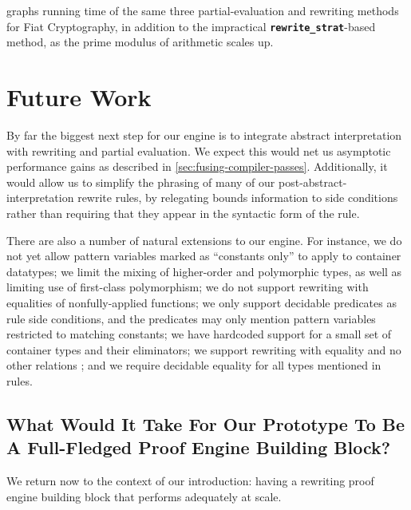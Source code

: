 \documentclass[sn-mathphys,pdflatex]{sn-jnl}%
\newcommand{\tacrewritestrat}{\textbf{\texttt{rewrite\_strat}}}
\theoremstyle{thmstyleone}%
\theoremstyle{thmstyletwo}%
\theoremstyle{thmstylethree}%
\begin{document}
 graphs running time of the same three partial-evaluation and rewriting methods for Fiat Cryptography, in addition to the impractical \tacrewritestrat{}-based method, as the prime modulus of arithmetic scales up.

\section{Future Work}\label{sec:future-work}

By far the biggest next step for our engine is to integrate abstract interpretation with rewriting and partial evaluation.
We expect this would net us asymptotic performance gains as described in \autoref{sec:fusing-compiler-passes}.
Additionally, it would allow us to simplify the phrasing of many of our post-abstract-interpretation rewrite rules, by relegating bounds information to side conditions rather than requiring that they appear in the syntactic form of the rule.

There are also a number of natural extensions to our engine.
For instance, we do not yet allow pattern variables marked as ``constants only'' to apply to container datatypes; we limit the mixing of higher-order and polymorphic types, as well as limiting use of first-class polymorphism; we do not support rewriting with equalities of nonfully-applied functions; we only support decidable predicates as rule side conditions, and the predicates may only mention pattern variables restricted to matching constants; we have hardcoded support for a small set of container types and their eliminators; we support rewriting with equality and no other relations%
; and we require decidable equality for all types mentioned in rules.

\subsection{What Would It Take For Our Prototype To Be A Full-Fledged Proof Engine Building Block?}\label{sec:going-further}

We return now to the context of our introduction: having a rewriting proof engine building block that performs adequately at scale.
\end{document}
